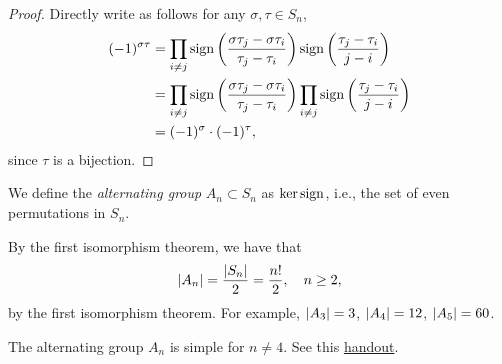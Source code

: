 \begin{proof}
    Directly write as follows for any $\sigma, \tau \in S_n$,
    \begin{align*}
        (-1)^{\sigma \tau} &= \prod_{i \neq j} \operatorname{sign} \left(\frac{\sigma\tau_j - \sigma\tau_i}{\tau_j - \tau_i}\right) \operatorname{sign} \left(\frac{\tau_j  - \tau_i}{j - i}\right) \\
        &= \prod_{i \neq j} \operatorname{sign} \left(\frac{\sigma\tau_j - \sigma\tau_i}{\tau_j - \tau_i}\right) \prod_{i \neq j} \operatorname{sign} \left(\frac{\tau_j  - \tau_i}{j - i}\right) \\
        &= (-1)^\sigma \cdot (-1)^\tau,
    \end{align*}
    since $\tau$ is a bijection.
\end{proof}
\begin{definition}
    We define the \textit{alternating group} $A_n \subset S_n$ as $\ker \operatorname{sign}$, i.e., the set of even permutations in $S_n$.
\end{definition}
\noindent By the first isomorphism theorem, we have that
\[ \left\lvert A_n \right\rvert = \frac{\left\lvert S_n \right\rvert}{2} = \frac{n!}{2}, \quad n \geq 2, \]
by the first isomorphism theorem. For example, $\left\lvert A_3 \right\rvert = 3$, $\left\lvert A_4 \right\rvert = 12$, $\left\lvert A_5 \right\rvert = 60$.
\begin{theorem}
    The alternating group $A_n$ is simple for $n \neq 4$. See this \href{https://drorbn.net/AcademicPensieve/Classes/25-347-GroupsRingsFields/SimplicityOfAn.pdf}{handout}.
\end{theorem}